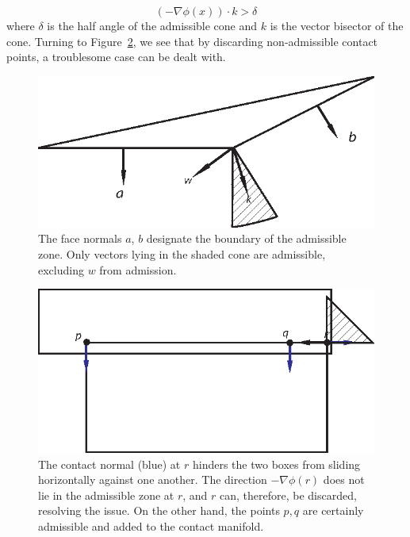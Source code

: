 \documentclass[9pt,twocolumn]{article}
\begin{document}
\begin{equation}
(-\nabla \phi(x)) \cdot k > \delta
\end{equation}
where $\delta$ is the half angle of the admissible cone and $k$ is the vector bisector of the cone. Turning to Figure~\ref{fig:AdmissibleExample}, we see that by discarding non-admissible contact points, a troublesome case can be dealt with.

\begin{figure}[h]
\centering
\includegraphics[scale = .85]{AdmissibleZone.eps}

\caption{The face normals $a$, $b$  designate the boundary of the admissible zone. Only vectors lying in the shaded cone are admissible, excluding $w$ from admission. }

\label{fig:AdmissibleZone}
\end{figure}


\begin{figure}[h]
\centering
\includegraphics[scale = 1.]{Figure_3.eps}

\caption{The contact normal (blue) at $r$ hinders the two boxes from sliding horizontally against one another. The direction $-\nabla \phi(r)$ does not lie in the admissible zone at $r$, and $r$ can, therefore, be discarded, resolving the issue. On the other hand, the points $p, q$ are certainly admissible and added to the contact manifold. 
}
\label{fig:AdmissibleExample}
\end{figure}
\end{document}
